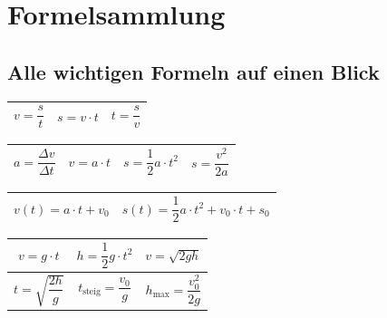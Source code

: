 \documentclass[11pt, a4paper]{article}
\begin{document}
\newpage


\section{Formelsammlung}

\subsection{Alle wichtigen Formeln auf einen Blick}

\begin{formelbox}[title=Gleichförmige Bewegung]
\begin{center}
\renewcommand{\arraystretch}{1.8}
\begin{tabular}{|c|c|c|}
\hline
$v = \dfrac{s}{t}$ & $s = v \cdot t$ & $t = \dfrac{s}{v}$ \\
\hline
\end{tabular}
\end{center}
\end{formelbox}

\begin{formelbox}[title=Gleichmäßig beschleunigte Bewegung (aus dem Stand)]
\begin{center}
\renewcommand{\arraystretch}{1.8}
\begin{tabular}{|c|c|c|c|}
\hline
$a = \dfrac{\Delta v}{\Delta t}$ & $v = a \cdot t$ & $s = \dfrac{1}{2} a \cdot t^2$ & $s = \dfrac{v^2}{2a}$ \\
\hline
\end{tabular}
\end{center}
\end{formelbox}

\begin{formelbox}[title={Mit Anfangsbedingungen ($v_0 \neq 0$, $s_0 \neq 0$)}]
\begin{center}
\renewcommand{\arraystretch}{1.8}
\begin{tabular}{|c|c|}
\hline
$v(t) = a \cdot t + v_0$ & $s(t) = \dfrac{1}{2} a \cdot t^2 + v_0 \cdot t + s_0$ \\
\hline
\end{tabular}
\end{center}
\end{formelbox}

\begin{formelbox}[title=Freier Fall und senkrechter Wurf]
\begin{center}
\renewcommand{\arraystretch}{1.8}
\begin{tabular}{|c|c|c|}
\hline
$v = g \cdot t$ & $h = \dfrac{1}{2} g \cdot t^2$ & $v = \sqrt{2gh}$ \\
\hline
$t = \sqrt{\dfrac{2h}{g}}$ & $t_{\text{steig}} = \dfrac{v_0}{g}$ & $h_{\text{max}} = \dfrac{v_0^2}{2g}$ \\
\hline
\end{tabular}
\end{center}
\end{formelbox}
\end{document}
